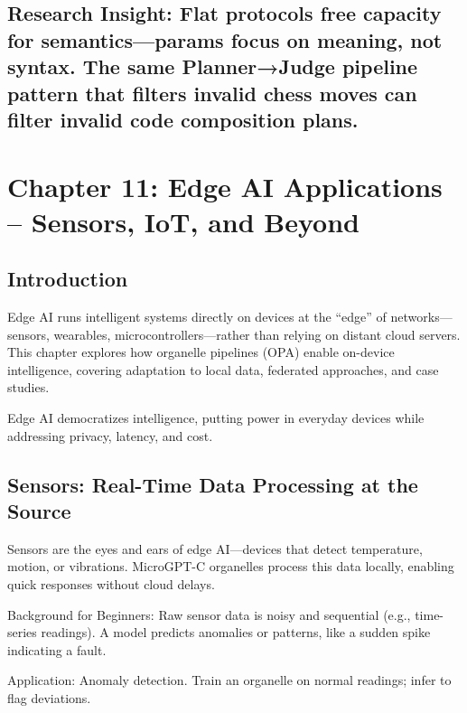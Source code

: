 \documentclass[
]{article}
\begin{document}
\subsection{Research Insight: Flat protocols free capacity for
semantics---params focus on meaning, not syntax. The same Planner→Judge
pipeline pattern that filters invalid chess moves can filter invalid
code composition
plans.}\label{research-insight-flat-protocols-free-capacity-for-semanticsparams-focus-on-meaning-not-syntax.-the-same-plannerjudge-pipeline-pattern-that-filters-invalid-chess-moves-can-filter-invalid-code-composition-plans.}

\section{Chapter 11: Edge AI Applications -- Sensors, IoT, and
Beyond}\label{chapter-11-edge-ai-applications-sensors-iot-and-beyond}

\subsection{Introduction}\label{introduction-10}

Edge AI runs intelligent systems directly on devices at the ``edge'' of
networks---sensors, wearables, microcontrollers---rather than relying on
distant cloud servers. This chapter explores how organelle pipelines
(OPA) enable on-device intelligence, covering adaptation to local data,
federated approaches, and case studies.

Edge AI democratizes intelligence, putting power in everyday devices
while addressing privacy, latency, and cost.

\subsection{Sensors: Real-Time Data Processing at the
Source}\label{sensors-real-time-data-processing-at-the-source}

Sensors are the eyes and ears of edge AI---devices that detect
temperature, motion, or vibrations. MicroGPT-C organelles process this
data locally, enabling quick responses without cloud delays.

Background for Beginners: Raw sensor data is noisy and sequential (e.g.,
time-series readings). A model predicts anomalies or patterns, like a
sudden spike indicating a fault.

Application: Anomaly detection. Train an organelle on normal readings;
infer to flag deviations.
\end{document}
